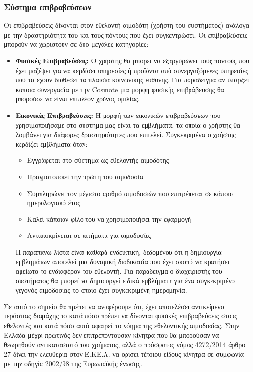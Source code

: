 	\subsubsection{Σύστημα επιβραβεύσεων}
	Οι επιβραβεύσεις δίνονται στον εθελοντή αιμοδότη (χρήστη του συστήματος) ανάλογα με την δραστηριότητα του και τους πόντους που έχει συγκεντρώσει. Οι επιβραβεύσεις μπορούν να χωριστούν σε δύο μεγάλες κατηγορίες:
	\begin{itemize}
		\item \textbf{Φυσικές Επιβραβεύσεις:} Ο χρήστης θα μπορεί να εξαργυρώνει τους πόντους που έχει μαζέψει για να κερδίσει υπηρεσίες ή προϊόντα από συνεργαζόμενες υπηρεσίες που τα έχουν διαθέσει τα πλαίσια κοινωνικής ευθύνης. Για παράδειγμα αν υπάρξει κάποια συνεργασία με την Cosmote μια μορφή φυσικής επιβράβευσης θα μπορούσε να είναι επιπλέον χρόνος ομιλίας.
		 \item \textbf{Εικονικές Επιβραβεύσεις:} Η μορφή των εικονικών επιβραβεύσεων που χρησιμοποιήσαμε στο σύστημα μας είναι τα εμβλήματα, τα οποία ο χρήστης θα λαμβάνει για διάφορες δραστηριότητες που επιτελεί. Συγκεκριμένα ο χρήστης κερδίζει εμβλήματα όταν:
		 
		 	\begin{itemize}
		 		\item Εγγράφεται στο σύστημα ως εθελοντής αιμοδότης
		 		\item Πραγματοποιεί την πρώτη του αιμοδοσία
		 		\item Συμπληρώνει τον μέγιστο αριθμό αιμοδοσιών που επιτρέπεται σε κάποιο ημερολογιακό έτος
		 		\item Καλεί κάποιον φίλο του να χρησιμοποιήσει την εφαρμογή
		 		\item Ανταποκρίνεται σε αιτήματα για αιμοδοσίες
		 	\end{itemize}
		 	Η παραπάνω λίστα είναι καθαρά ενδεικτική, δεδομένου ότι η δημιουργία εμβλημάτων αποτελεί μια δυναμική διαδικασία που έχει σκοπό να κρατήσει αμείωτο το ενδιαφέρον του εθελοντή. Για παράδειγμα ο διαχειριστής του συστήματος θα μπορεί να δημιουργεί ειδικά εμβλήματα για ένα συγκεκριμένο γεγονός αιμοδοσίας το οποίο έχει συγκεκριμένη ημερομηνία.
	\end{itemize}
	
	Σε αυτό το σημείο θα πρέπει να αναφέρουμε ότι, έχει αποτελέσει αντικείμενο τεράστιας διαμάχης το κατά πόσο πρέπει να δίνονται φυσικές επιβραβεύσεις στους εθελοντές και κατά πόσο αυτό αφαιρεί το νόημα της εθελοντικής αιμοδοσίας. Στην Ελλάδα μέχρι πρωτινός δεν επιτρεπόντουσαν κίνητρα που θα μπορούσαν να θεωρηθούν αντικαταστατό του χρήματος, αλλά ο πρόσφατος νόμος 4272/2014 άρθρο 27 δίνει την ελευθερία στον Ε.ΚΕ.Α. να ορίσει τέτοιου είδους κίνητρα σε συμφωνία με την οδηγία 2002/98 της Ευρωπαϊκής ένωσης.
	
